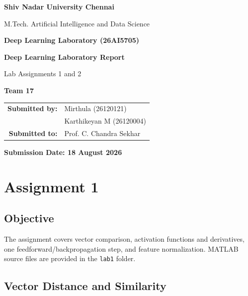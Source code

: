 \documentclass[11pt,a4paper]{article}
\renewcommand{\arraystretch}{1.18}
\begin{document}

\begin{titlepage}
    \centering
    {\LARGE\bfseries Shiv Nadar University Chennai\par}
    \vspace{0.4cm}
    {\large M.Tech. Artificial Intelligence and Data Science\par}
    \vspace{0.2cm}
    {\large\bfseries Deep Learning Laboratory (26AI5705)\par}

    \vfill
    {\Huge\bfseries Deep Learning Laboratory Report\par}
    \vspace{0.5cm}
    {\Large Lab Assignments 1 and 2\par}

    \vfill
    {\Large\bfseries Team 17\par}
    \vspace{0.35cm}
    {\large
    \renewcommand{\arraystretch}{1.35}
    \begin{tabular}{@{}rl@{}}
        \textbf{Submitted by:} & Mirthula (26120121) \\
                               & Karthikeyan M (26120004) \\
        \textbf{Submitted to:} & Prof. C. Chandra Sekhar \\
    \end{tabular}\par}
    \vfill
    {\large\bfseries Submission Date: 18 August 2026\par}
\end{titlepage}

\tableofcontents
\clearpage
{}

\section{Assignment 1}
\setcounter{table}{0}
\setcounter{figure}{0}
\setcounter{equation}{0}

\subsection{Objective}
The assignment covers vector comparison, activation functions and derivatives, one feedforward/backpropagation step, and feature normalization. MATLAB source files are provided in the \texttt{lab1} folder.

\subsection{Vector Distance and Similarity}
\end{document}
